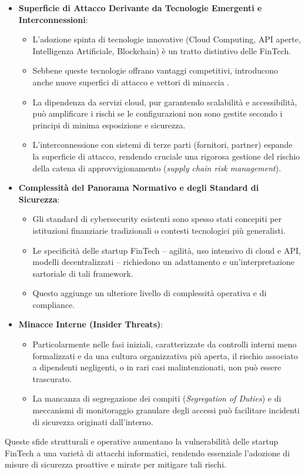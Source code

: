 \begin{itemize}
    \item \textbf{Superficie di Attacco Derivante da Tecnologie Emergenti e Interconnessioni}:
    \begin{itemize}
        \item L'adozione spinta di tecnologie innovative (Cloud Computing, API aperte, Intelligenza Artificiale, Blockchain) è un tratto distintivo delle FinTech.
        \item Sebbene queste tecnologie offrano vantaggi competitivi, introducono anche nuove superfici di attacco e vettori di minaccia \cite{fintechChallenges}.
        \item La dipendenza da servizi cloud, pur garantendo scalabilità e accessibilità, può amplificare i rischi se le configurazioni non sono gestite secondo i principi di minima esposizione e sicurezza.
        \item L'interconnessione con sistemi di terze parti (fornitori, partner) espande la superficie di attacco, rendendo cruciale una rigorosa gestione del rischio della catena di approvvigionamento (\emph{supply chain risk management}).
    \end{itemize}
    
    \item \textbf{Complessità del Panorama Normativo e degli Standard di Sicurezza}:
    \begin{itemize}
        \item Gli standard di cybersecurity esistenti sono spesso stati concepiti per istituzioni finanziarie tradizionali o contesti tecnologici più generalisti.
        \item Le specificità delle startup FinTech – agilità, uso intensivo di cloud e API, modelli decentralizzati – richiedono un adattamento e un'interpretazione sartoriale di tali framework.
        \item Questo aggiunge un ulteriore livello di complessità operativa e di compliance.
    \end{itemize}
    
    \item \textbf{Minacce Interne (Insider Threats)}:
    \begin{itemize}
        \item Particolarmente nelle fasi iniziali, caratterizzate da controlli interni meno formalizzati e da una cultura organizzativa più aperta, il rischio associato a dipendenti negligenti, o in rari casi malintenzionati, non può essere trascurato.
        \item La mancanza di segregazione dei compiti (\emph{Segregation of Duties}) e di meccanismi di monitoraggio granulare degli accessi può facilitare incidenti di sicurezza originati dall'interno.
    \end{itemize}
\end{itemize}
Queste sfide strutturali e operative aumentano la vulnerabilità delle startup FinTech a una varietà di attacchi informatici, rendendo essenziale l'adozione di misure di sicurezza proattive e mirate per mitigare tali rischi.

